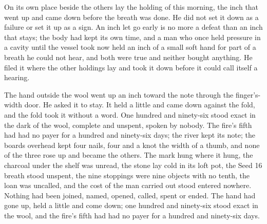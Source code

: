 On its own place beside the others lay the holding of this morning, the inch that went up and came down before the breath was done. He did not set it down as a failure or set it up as a sign. An inch let go early is no more a defeat than an inch that stays; the body had kept its own time, and a man who once held pressure in a cavity until the vessel took now held an inch of a small soft hand for part of a breath he could not hear, and both were true and neither bought anything. He filed it where the other holdings lay and took it down before it could call itself a hearing.

The hand outside the wool went up an inch toward the note through the finger's-width door. He asked it to stay. It held a little and came down against the fold, and the fold took it without a word. One hundred and ninety-six stood exact in the dark of the wool, complete and unspent, spoken by nobody. The fire's fifth had had no payer for a hundred and ninety-six days; the river kept its note; the boards overhead kept four nails, four and a knot the width of a thumb, and none of the three rose up and became the others. The mark hung where it hung, the charcoal under the shelf was unread, the stone lay cold in its loft pot, the Seed 16 breath stood unspent, the nine stoppings were nine objects with no tenth, the loan was uncalled, and the cost of the man carried out stood entered nowhere. Nothing had been joined, named, opened, called, spent or ended. The hand had gone up, held a little and come down; one hundred and ninety-six stood exact in the wool, and the fire's fifth had had no payer for a hundred and ninety-six days.
